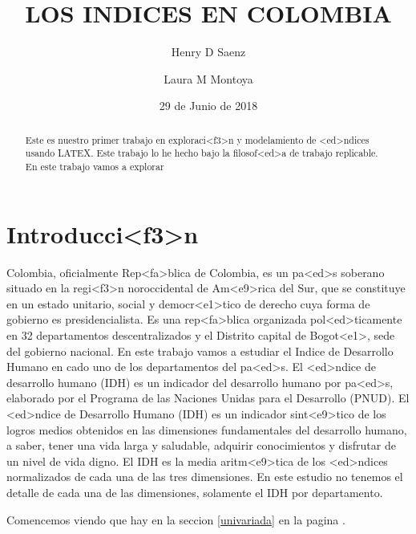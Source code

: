 \documentclass{article}
\title{LOS INDICES EN COLOMBIA}
\author[1]{\normalsize Henry D Saenz}
\author[2]{\normalsize Laura M Montoya}
\affil[1,2]{\small  Universidad de los Andes\\
\texttt{{hd.saenz10,lm.montoya10}@uniandes.edu.col}}
\affil[1,2]{\small Ecole des Mines de Nantes\\
\texttt{{hsaenz16,lmontoya16}@imt-atlantique.fr}}
\date{29 de Junio de 2018}
\begin{document}


\maketitle


\begin{abstract}
Este es nuestro primer trabajo en exploraci<f3>n y modelamiento de <ed>ndices usando LATEX. Este trabajo lo he hecho bajo la filosof<ed>a de trabajo replicable. En este trabajo vamos a explorar
\end{abstract}

\section*{Introducci<f3>n}

Colombia, oficialmente Rep<fa>blica de Colombia, es un pa<ed>s soberano situado en la regi<f3>n noroccidental de Am<e9>rica del Sur, que se constituye en un estado unitario, social y democr<e1>tico de derecho cuya forma de gobierno es presidencialista. Es una rep<fa>blica organizada pol<ed>ticamente en 32 departamentos descentralizados y el Distrito capital de Bogot<e1>, sede del gobierno nacional.  En este trabajo vamos a estudiar el Indice de Desarrollo Humano en cado uno de los departamentos del pa<ed>s. 
El <ed>ndice de desarrollo humano (IDH) es un indicador del desarrollo humano por pa<ed>s, elaborado por el Programa de las Naciones Unidas para el Desarrollo (PNUD). El <ed>ndice de Desarrollo Humano (IDH) es un indicador sint<e9>tico de los logros medios obtenidos en las dimensiones fundamentales del desarrollo humano, a saber, tener una vida larga y saludable, adquirir conocimientos y disfrutar de un nivel de vida digno. El IDH es la media aritm<e9>tica de los <ed>ndices normalizados de cada una de las tres dimensiones. En este estudio no tenemos el detalle de cada una de las dimensiones, solamente el IDH por departamento.

Comencemos viendo que hay en la seccion \ref{univariada} en la pagina \pageref{univariada}.

\clearpage








\renewcommand{\refname}{Bibliografia}

\end{document}
